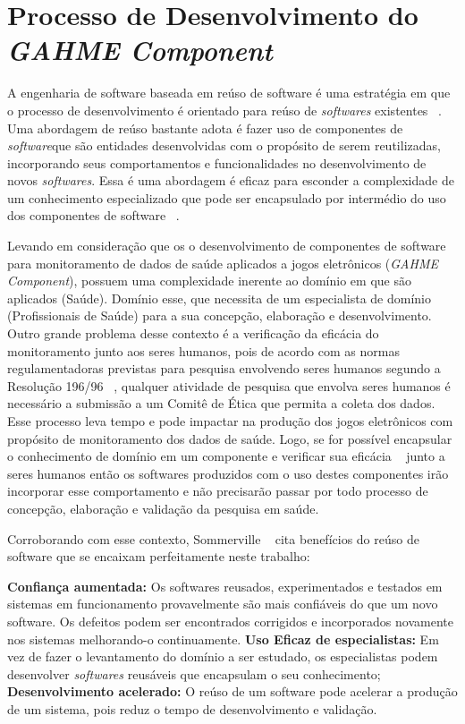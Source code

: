 \chapter{Processo de Desenvolvimento do \textit{GAHME Component}}
A engenharia de software baseada em reúso de software é uma estratégia em que o processo de desenvolvimento é orientado para reúso de \textit{softwares} existentes ~\cite{sommerville2011}. Uma abordagem de reúso bastante adota é fazer uso de componentes de \textit{software}que são entidades desenvolvidas com o propósito de serem reutilizadas, incorporando seus comportamentos e funcionalidades no desenvolvimento de novos \textit{softwares}. Essa é uma abordagem é eficaz para esconder a complexidade de um conhecimento especializado que pode ser encapsulado por intermédio do uso dos componentes de software ~\cite{sommerville2011}.

Levando em consideração que os o desenvolvimento de componentes de software para monitoramento de dados de saúde aplicados a jogos eletrônicos (\textit{GAHME Component}), possuem uma complexidade inerente ao domínio em que são aplicados (Saúde). Domínio esse, que necessita de um especialista de domínio (Profissionais de Saúde) para a sua concepção, elaboração e desenvolvimento. Outro grande problema desse contexto é a verificação da eficácia do monitoramento junto aos seres humanos, pois de acordo com as normas regulamentadoras previstas para pesquisa envolvendo seres humanos segundo a Resolução 196/96 ~\cite{conselho2000normas}, qualquer atividade de pesquisa que envolva seres humanos é necessário a submissão a um Comitê de Ética que permita a coleta dos dados. Esse processo leva tempo e pode impactar na produção dos jogos eletrônicos com propósito de monitoramento dos dados de saúde. Logo, se for possível encapsular o conhecimento de domínio em um componente e verificar sua eficácia ~\cite{kato12} junto a seres humanos então os softwares produzidos com o uso destes componentes irão incorporar esse comportamento e não precisarão passar por todo processo de concepção, elaboração e validação da pesquisa em saúde.

Corroborando com esse contexto, Sommerville ~\cite{sommerville2011} cita benefícios do reúso de software que se encaixam perfeitamente neste trabalho:
	\begin{itemize}
		\textbf{Confiança aumentada:} Os softwares reusados, experimentados e testados em sistemas em funcionamento provavelmente são mais confiáveis do que um novo software. Os defeitos podem ser encontrados corrigidos e incorporados novamente nos sistemas melhorando-o continuamente.
		\textbf{Uso Eficaz de especialistas:} Em vez de fazer o levantamento do domínio a ser estudado, os especialistas podem desenvolver \textit{softwares} reusáveis que encapsulam o seu conhecimento;
		\textbf{Desenvolvimento acelerado:} O reúso de um software pode acelerar a produção de um sistema, pois reduz o tempo de desenvolvimento e validação.
	\end{itemize}

